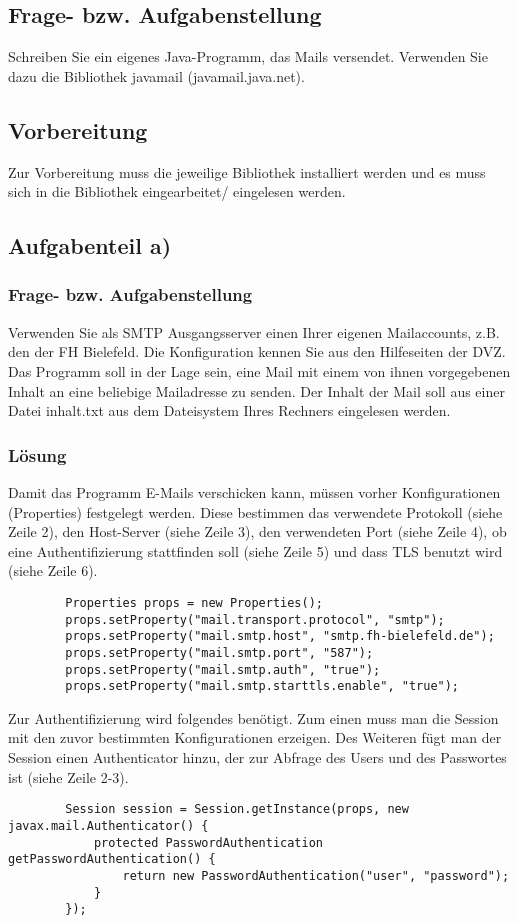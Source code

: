 \subsection{Frage- bzw. Aufgabenstellung}
Schreiben Sie ein eigenes Java-Programm, das Mails versendet. Verwenden Sie dazu die Bibliothek javamail (javamail.java.net). 

\subsection{Vorbereitung}
Zur Vorbereitung muss die jeweilige Bibliothek installiert werden und es muss sich in die Bibliothek eingearbeitet/ eingelesen werden.

\subsection{Aufgabenteil a)}
\subsubsection{Frage- bzw. Aufgabenstellung}

Verwenden Sie als SMTP Ausgangsserver einen Ihrer eigenen Mailaccounts, z.B. den der FH Bielefeld. Die Konfiguration kennen Sie aus den Hilfeseiten der DVZ. Das Programm soll in der Lage sein, eine Mail mit einem von ihnen vorgegebenen Inhalt an eine beliebige Mailadresse zu senden. Der Inhalt der Mail soll aus einer Datei inhalt.txt aus dem Dateisystem Ihres Rechners eingelesen werden.

\subsubsection{Lösung}
Damit das Programm E-Mails verschicken kann, müssen vorher Konfigurationen (Properties) festgelegt werden. Diese bestimmen das verwendete Protokoll (siehe Zeile 2), den Host-Server (siehe Zeile 3), den verwendeten Port (siehe Zeile 4), ob eine Authentifizierung stattfinden soll (siehe Zeile 5) und dass TLS benutzt wird (siehe Zeile 6).
\begin{lstlisting}
		Properties props = new Properties();
		props.setProperty("mail.transport.protocol", "smtp");
		props.setProperty("mail.smtp.host", "smtp.fh-bielefeld.de");
		props.setProperty("mail.smtp.port", "587");
		props.setProperty("mail.smtp.auth", "true");
		props.setProperty("mail.smtp.starttls.enable", "true");
\end{lstlisting}


Zur Authentifizierung wird folgendes benötigt. Zum einen muss man die Session mit den zuvor bestimmten Konfigurationen erzeigen. Des Weiteren fügt man der Session einen Authenticator hinzu, der zur Abfrage des Users und des Passwortes ist (siehe Zeile 2-3).
\begin{lstlisting}
		Session session = Session.getInstance(props, new javax.mail.Authenticator() {
			protected PasswordAuthentication getPasswordAuthentication() {
				return new PasswordAuthentication("user", "password");
			}
		});
\end{lstlisting}


